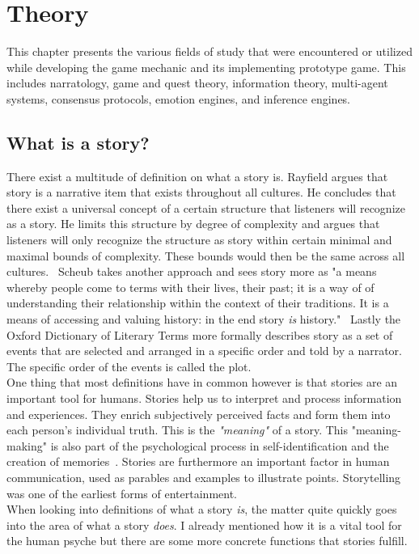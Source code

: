 \chapter{Theory} %
This chapter presents the various fields of study that were encountered or utilized while developing the game mechanic and its implementing prototype game. This includes narratology, game and quest theory, information theory, multi-agent systems, consensus protocols, emotion engines, and inference engines.
\section{What is a story?}
There exist a multitude of definition on what a story is. Rayfield argues that story is a narrative item that exists throughout all cultures. He concludes that there exist a universal concept of a certain structure that listeners will recognize as a story. He limits this structure by degree of complexity and argues that listeners will only recognize the structure as story within certain minimal and maximal bounds of complexity. These bounds would then be the same across all cultures.~\cite{Rayfield1972} Scheub takes another approach and sees story more as "a means whereby people come to terms with their lives, their past; it is a way of of understanding their relationship within the context of their traditions. It is a means of accessing and valuing history: in the end story \textit{is} history."~\cite{Scheub1998} Lastly the Oxford Dictionary of Literary Terms more formally describes story as a set of events that are selected and arranged in a specific order and told by a narrator. The specific order of the events is called the plot.~\cite{Baldick1996}\\
One thing that most definitions have in common however is that stories are an important tool for humans. Stories help us to interpret and process information and experiences. They enrich subjectively perceived facts and form them into each person's individual truth. This is the \textit{"meaning"} of a story. This "meaning-making" is also part of the psychological process in self-identification and the creation of memories~\cite{Flanagan1992}. Stories are furthermore an important factor in human communication, used as parables and examples to illustrate points. Storytelling was one of the earliest forms of entertainment.\\
When looking into definitions of what a story \textit{is}, the matter quite quickly goes into the area of what a story \textit{does}. I already mentioned how it is a vital tool for the human psyche but there are some more concrete functions that stories fulfill.
